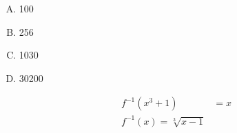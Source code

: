{{        %
        \begin{practices}
            \begin{enumerate}[A.]
                \item 100
                \item 256
                \item 1030
                \item 30200
            \end{enumerate}
        \end{practices}

        \begin{practices}

        \end{practices}

        \begin{practices}

        \end{practices}

        \begin{practices}

        \end{practices}

        \begin{practices}

        \end{practices}

        \begin{practices}

        \end{practices}

        \begin{practices}

        \end{practices}

        \begin{practices}

        \end{practices}

        \begin{practices}
            \begin{align*}
                f^{-1}(x^3 + 1) &= x \\
                f^{-1}(x) = \sqrt[3]{x - 1}
            \end{align*}
        \end{practices}

}}
